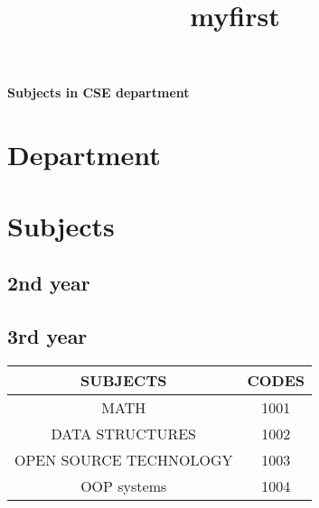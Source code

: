 \documentclass[a4paper,12pt]{report}
\begin{document}
\title{myfirst}
\textbf{Subjects in CSE department}
\section{Department}
\section{Subjects}
\subsection{2nd year}
\subsection{3rd year}
\newpage
\begin{tabular}{|c|c|}
\hline
SUBJECTS&CODES\\
\hline
MATH&1001\\
\hline
DATA STRUCTURES&1002\\
\hline
OPEN SOURCE TECHNOLOGY&1003\\
\hline
OOP systems&1004\\
\hline
\end{tabular}
\end{document}
